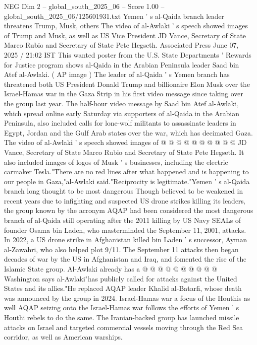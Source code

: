 \begin{textsample}{NEG Dim 2 – global\_south\_2025\_06 – Score 1.00 – global\_south\_2025\_06/125601931.txt}  \label{ex:f2_neg_362}
Yemen ' s al-Qaida branch leader threatens Trump, Musk, others The video of al-Awlaki ' s speech showed images of Trump and Musk, as well as US Vice President JD Vance, Secretary of State Marco Rubio and Secretary of State Pete Hegseth.
Associated Press June 07, 2025 / 21:02 IST This wanted poster from the U.S.
State Departments ' Rewards for Justice program shows al-Qaida in the Arabian Peninsula leader Saad bin Atef al-Awlaki. ( AP image ) The leader of al-Qaida ' s Yemen branch has threatened both US President Donald Trump and billionaire Elon Musk over the Israel-Hamas war in the Gaza Strip in his first video message since taking over the group last year.
The half-hour video message by Saad bin Atef al-Awlaki, which spread online early Saturday via supporters of al-Qaida in the Arabian Peninsula, also included calls for lone-wolf militants to assassinate leaders in Egypt, Jordan and the Gulf Arab states over the war, which has decimated Gaza.
The video of al-Awlaki ' s speech showed images of @ @ @ @ @ @ @ @ @ @ JD Vance, Secretary of State Marco Rubio and Secretary of State Pete Hegseth.
It also included images of logos of Musk ' s businesses, including the electric carmaker Tesla."There are no red lines after what happened and is happening to our people in Gaza,"al-Awlaki said."Reciprocity is legitimate."Yemen ' s al-Qaida branch long thought to be most dangerous Though believed to be weakened in recent years due to infighting and suspected US drone strikes killing its leaders, the group known by the acronym AQAP had been considered the most dangerous branch of al-Qaida still operating after the 2011 killing by US Navy SEALs of founder Osama bin Laden, who masterminded the September 11, 2001, attacks.
In 2022, a US drone strike in Afghanistan killed bin Laden ' s successor, Ayman al-Zawahri, who also helped plot 9/11.
The September 11 attacks then began decades of war by the US in Afghanistan and Iraq, and fomented the rise of the Islamic State group.
Al-Awlaki already has a @ @ @ @ @ @ @ @ @ @ Washington says al-Awlaki"has publicly called for attacks against the United States and its allies."He replaced AQAP leader Khalid al-Batarfi, whose death was announced by the group in 2024.
Israel-Hamas war a focus of the Houthis as well AQAP seizing onto the Israel-Hamas war follows the efforts of Yemen ' s Houthi rebels to do the same.
The Iranian-backed group has launched missile attacks on Israel and targeted commercial vessels moving through the Red Sea corridor, as well as American warships.

\end{textsample}

